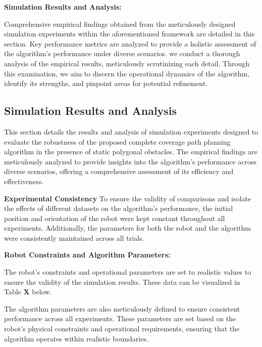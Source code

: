 \textbf{Simulation Results and Analysis:} 

Comprehensive empirical findings obtained from the meticulously designed simulation experiments within the aforementioned framework are detailed in this section. Key performance metrics are analyzed to provide a holistic assessment of the algorithm's performance under diverse scenarios. we conduct a thorough analysis of the empirical results, meticulously scrutinizing each detail. Through this examination, we aim to discern the operational dynamics of the algorithm, identify its strengths, and pinpoint areas for potential refinement.
\vspace*{6mm}  


\subsection{Simulation Results and Analysis}

This section details the results and analysis of simulation experiments designed to evaluate the robustness of the proposed complete coverage path planning algorithm in the presence of static polygonal obstacles. The empirical findings are meticulously analyzed to provide insights into the algorithm's performance across diverse scenarios, offering a comprehensive assessment of its efficiency and effectiveness.

\vspace*{6mm}  

\textbf{Experimental Consistency}
To ensure the validity of comparisons and isolate the effects of different datasets on the algorithm's performance, the initial position and orientation of the robot were kept constant throughout all experiments. Additionally, the parameters for both the robot and the algorithm were consistently maintained across all trials.

\vspace*{6mm}  

\textbf{Robot Constraints and Algorithm Parameters: } 


The robot's constraints and operational parameters are set to realistic values to ensure the validity of the simulation results. These data can be visualized in Table \textbf{X} below.

\vspace*{6mm}  

The algorithm parameters are also meticulously defined to ensure consistent performance across all experiments. These parameters are set based on the robot's physical constraints and operational requirements, ensuring that the algorithm operates within realistic boundaries.


